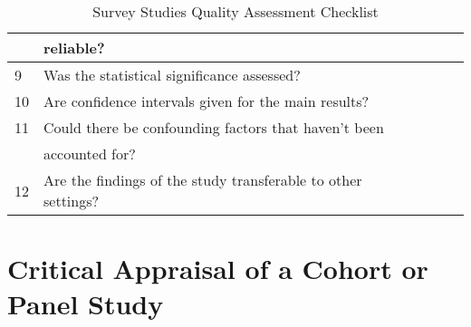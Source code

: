 \begin{table}[H]
\begin{center}
{\begin{tabular}{|l||l|l|l|l|}
                           & reliable?                                                        &&& \\
                        \hline
                        9  & Was the statistical significance assessed?                       &&& \\
                        \hline
                        10 & Are confidence intervals given for the main results?             &&& \\
                        \hline
                        11 & Could there be confounding factors that haven’t been             &&& \\
                           & accounted for?                                                   &&& \\
                        \hline
                        12 & Are the findings of the study transferable to other settings?    &&& \\
                        \hline
                \end{tabular}}
        \end{center}
        \caption{Survey Studies Quality Assessment Checklist}
        \label{table:surveyStudy}
\end{table}
    

\section*{Critical Appraisal of a Cohort or Panel Study}

